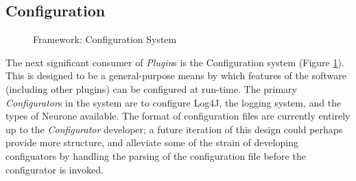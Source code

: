 \documentclass{acm_proc_article-sp}
\begin{document}
\subsection{Configuration}
{
\begin{figure}[t]
\centering
{}
\caption{Framework: Configuration System}
\label{fig:framework:conf}
\end{figure}
The next significant consumer of {\textit{Plugin}}s is the Configuration system (Figure \ref{fig:framework:conf}). This is designed to be a general{}-purpose means by which features of the software (including other plugins) can be configured at run{}-time. The primary {\textit{Configurator}}s in the system are to configure Log4J, the logging system, and the types of Neurone available. The format of configuration files are currently entirely up to the {\textit{Configurator}} developer; a future iteration of this design could perhaps provide more structure, and alleviate some of the strain of developing configuators by handling the parsing of the configuration file before the configurator is invoked.
}
\end{document}
